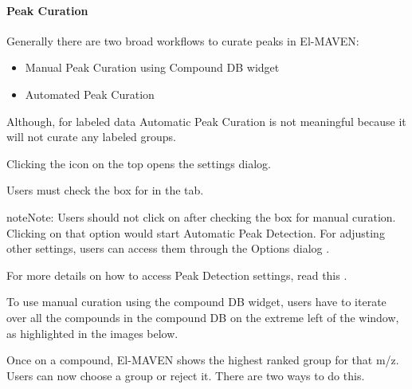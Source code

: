 \documentclass[letterpaper,10pt,english,openany,oneside]{sphinxmanual}
\begin{document}


\paragraph{Peak Curation}
\label{\detokenize{LabeledLCMSWorkflow:peak-curation}}
Generally there are two broad workflows to curate peaks in El-MAVEN:
\begin{itemize}
\item {} 
Manual Peak Curation using Compound DB widget

\item {} 
Automated Peak Curation

\end{itemize}

Although, for labeled data Automatic Peak Curation is not meaningful because it will not curate any labeled groups.


Clicking the  icon  on the top opens the settings dialog.


Users must check the box for  in the  tab.

\begin{sphinxadmonition}{note}{Note:}
Users should not click on  after checking the box for manual curation. Clicking on that option would start Automatic Peak Detection. For adjusting other settings, users can access them through the Options  dialog .
\end{sphinxadmonition}

For more details on how to access Peak Detection settings, read this .

To use manual curation using the compound DB widget, users have to iterate over all the compounds in the compound DB on the extreme left of the window, as highlighted in the images below.



Once on a compound, El-MAVEN shows the highest ranked group for that m/z. Users can now choose a group or reject it. There are two ways to do this.
\end{document}
